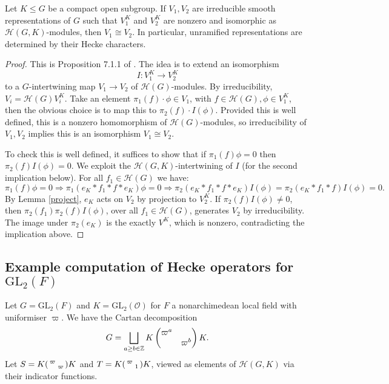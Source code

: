 \begin{prop}
    Let $K \leq G$ be a compact open subgroup. If $V_1,V_2$ are irreducible smooth representations of $G$ such that $V_1^K$ and $V_2^K$ are nonzero and isomorphic as $\mathcal H(G,K)$-modules, then $V_1 \cong V_2$. In particular, unramified representations are determined by their Hecke characters.
\end{prop}
\begin{proof}
    This is Proposition 7.1.1 of \cite{GH1}. The idea is to extend an isomorphism $$I: V_1^K \to V_2^K$$ to a $G$-intertwining map $V_1\to V_2$ of $\mathcal H(G)$-modules. By irreducibility, $V_i = \mathcal H(G)V_i^K$. Take an element $\pi_1(f) \cdot \phi \in V_1$, with $f \in \mathcal H(G), \phi \in V_1^K$, then the obvious choice is to map this to $\pi_2(f) \cdot I(\phi)$. Provided this is well defined, this is a nonzero homomorphism of $\mathcal H(G)$-modules, so irreducibility of $V_1,V_2$ implies this is an isomorphism $V_1 \cong V_2$.

    To check this is well defined, it suffices to show that if $\pi_1(f)\phi =0$ then $\pi_2(f)I(\phi)=0$. We exploit the $\mathcal H(G,K)$-intertwining of $I$ (for the second implication below). For all $f_1 \in \mathcal H(G)$ we have:
    $$\pi_1(f)\phi = 0 \Rightarrow \pi_1(e_K*f_1*f*e_K)\phi = 0 \Rightarrow \pi_2(e_K*f_1*f*e_K)I(\phi)=\pi_2(e_K*f_1*f)I(\phi)=0.$$
    By Lemma \ref{project}, $e_K$ acts on $V_2$ by projection to $V_2^K$. If $\pi_2(f)I(\phi) \neq 0$, then $\pi_2(f_1)\pi_2(f)I(\phi)$, over all $f_1 \in \mathcal H(G)$, generates $V_2$ by irreducibility. The image under $\pi_2(e_K)$ is the exactly $V^K$, which is nonzero, contradicting the implication above.
\end{proof}

\subsection{Example computation of Hecke operators for $\mathrm{GL}_2(F)$}

Let $G=\mathrm{GL}_2(F)$ and $K=\mathrm{GL}_2(\mathcal O)$ for $F$ a nonarchimedean local field with uniformiser $\varpi$. We have the Cartan decomposition $$G = \bigsqcup\limits_{a \geq b \in \mathbb{Z}} K \begin{pmatrix} \varpi^a & \\ & \varpi^b \end{pmatrix}K.$$ Let $S=K \begin{psmallmatrix} \varpi & \\ & \varpi \end{psmallmatrix}K$ and $T=K \begin{psmallmatrix} \varpi & \\ & 1 \end{psmallmatrix}K$, viewed as elements of $\mathcal H(G,K)$ via their indicator functions.

